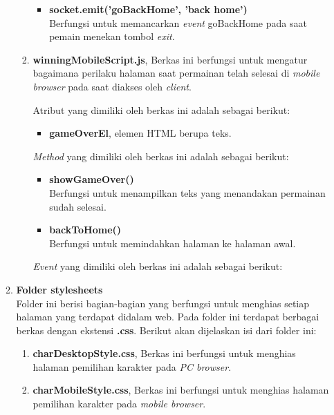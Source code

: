 \begin{enumerate}
\begin{enumerate}
\begin{enumerate}
\begin{itemize}
				\item \textbf{socket.emit('goBackHome', 'back home')} \\
				Berfungsi untuk memancarkan \textit{event} goBackHome pada saat pemain menekan tombol \textit{exit}. 
				 
			\end{itemize}
			
			\item \textbf{winningMobileScript.js}, Berkas ini berfungsi untuk mengatur bagaimana perilaku halaman saat permainan telah selesai di \textit{mobile browser} pada saat diakses oleh \textit{client}.
			
			Atribut yang dimiliki oleh berkas ini adalah sebagai berikut:
			\begin{itemize}
				\item \textbf{gameOverEl}, elemen HTML berupa teks.
			\end{itemize}
			
			\textit{Method} yang dimiliki oleh berkas ini adalah sebagai berikut:
			\begin{itemize}
				\item \textbf{showGameOver()} \\
				Berfungsi untuk menampilkan teks yang menandakan permainan sudah selesai.
				
				\item \textbf{backToHome()} \\
				Berfungsi untuk memindahkan halaman ke halaman awal.
			\end{itemize}
			
			\textit{Event} yang dimiliki oleh berkas ini adalah sebagai berikut:
			
		\end{enumerate}
		\item \textbf{Folder stylesheets} \\ 
		Folder ini berisi bagian-bagian yang berfungsi untuk menghias setiap halaman yang terdapat didalam web. Pada folder ini terdapat berbagai berkas dengan ekstensi \textbf{.css}. Berikut akan dijelaskan isi dari folder ini:
		
		\begin{enumerate}
			\item \textbf{charDesktopStyle.css}, Berkas ini berfungsi untuk menghias halaman pemilihan karakter pada \textit{PC browser}.
			
			\item \textbf{charMobileStyle.css}, Berkas ini berfungsi untuk menghias halaman pemilihan karakter pada \textit{mobile browser}.
			

\end{enumerate}
\end{enumerate}
\end{enumerate}
